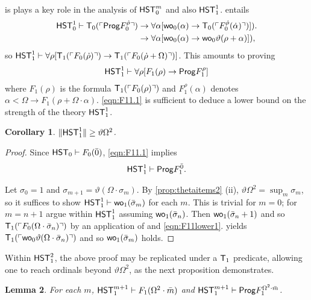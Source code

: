 \documentclass[UKenglish,cleveref,DIV=12]{scrartcl}
\newtheorem{lemma}{Lemma}[section]
\newtheorem{corollary}[lemma]{Corollary}
\theoremstyle{definition}
\theoremstyle{definition}
\begin{document}
 is plays a key role in the analysis of $\mathsf{HST}_0^m$ and also $\mathsf{HST}_1^1$.  entails
\begin{align*}
 \mathsf{HST}_0^1\vdash\mathsf{T}_0(\ulcorner{\mathsf{Prog}F_0^{\dot\rho}}\urcorner)
	&\rightarrow {\forall\alpha[\mathsf{wo}_0(\alpha)\rightarrow \mathsf{T}_0(\ulcorner{F_0^{\dot\rho}(\dot\alpha)}\urcorner)]}).\\
	&\rightarrow {\forall\alpha[\mathsf{wo}_0(\alpha)\rightarrow \mathsf{wo}_0\vartheta(\rho+\alpha)]}),
\end{align*}
so $\mathsf{HST}_1^1\vdash \forall\rho[\mathsf{T}_1(\ulcorner{F_0(\dot\rho)}\urcorner)\rightarrow \mathsf{T}_1(\ulcorner{F_0(\dot\rho+\Omega)}\urcorner)]$. This amounts to proving
\begin{align}\label{eqn:F11.1}
  \mathsf{HST}_1^1\vdash \forall\rho[{F_1(\rho)}\rightarrow \mathsf{Prog}  F_1^\rho]
\end{align}
where $F_1(\rho)$ is the formula $\mathsf{T}_1(\ulcorner{F_0(\rho)}\urcorner)$ and
$F_1^\rho(\alpha)$ denotes $\alpha<\Omega\rightarrow F_1(\rho+\Omega\cdot\alpha)$.
\eqref{eqn:F11.1} is sufficient to deduce a lower bound on the strength of the
theory $\mathsf{HST}_1^1$.
\begin{corollary}\label{cor:F11lowerbound}
  $\lVert{\mathsf{HST}_1^1}\rVert\ge\vartheta\Omega^2$.
\end{corollary}
\begin{proof}
Since $\mathsf{HST}_0\vdash F_0(\bar0)$, \eqref{eqn:F11.1} implies
\begin{gather}\label{eqn:F11lower1}
 \mathsf{HST}_1^1\vdash \mathsf{Prog}  F^{\bar 0}_1.
\end{gather}

Let $\sigma_0=1$ and $\sigma_{m+1}=\vartheta(\Omega\cdot\sigma_m)$. By
\cref{prop:thetaitems2} (ii), $\vartheta\Omega^2=\sup_m\sigma_m$, so it
suffices to show $\mathsf{HST}_1^1\vdash\mathsf{wo}_1(\bar\sigma_m)$ for each $m$. This is
trivial for $m=0$; for $m=n+1$ argue within $\mathsf{HST}_1^1$ assuming
$\mathsf{wo}_1(\bar\sigma_n)$. Then $\mathsf{wo}_1(\bar\sigma_n+1)$ and so $\mathsf{T}_1(\ulcorner{F_0(\Omega\cdot\bar\sigma_n)}\urcorner)$
by an application of  and \eqref{eqn:F11lower1}.  yields $\mathsf{T}_1(\ulcorner{\mathsf{wo}_0\vartheta(\Omega\cdot\bar\sigma_n)}\urcorner)$ and so $\mathsf{wo}_1(\bar\sigma_m)$
holds.
\end{proof}
Within $\mathsf{HST}_1^2$, the above proof may be replicated under a $\mathsf{T}_1$ predicate,
allowing one to reach ordinals beyond $\vartheta\Omega^2$, as the next
proposition demonstrates.
\begin{lemma}\label{prop:F1wellordering}
For each $m$, $\mathsf{HST}_1^{m+1}\vdash F_1(\Omega^2\cdot\bar m)$ and $\mathsf{HST}_1^{m+1}\vdash \mathsf{Prog}  F_1^{\Omega^2\cdot\bar m}$.
\end{lemma}
\end{document}
